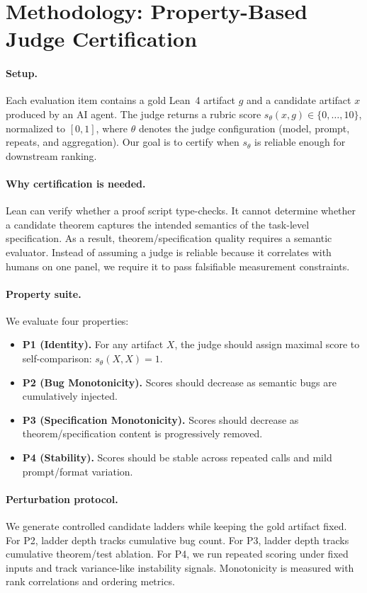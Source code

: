 \section{Methodology: Property-Based Judge Certification}

\paragraph{Setup.}
Each evaluation item contains a gold Lean~4 artifact \(g\) and a candidate artifact \(x\) produced by an AI agent.
The judge returns a rubric score \(s_\theta(x,g)\in\{0,\dots,10\}\), normalized to \([0,1]\), where \(\theta\) denotes the judge configuration (model, prompt, repeats, and aggregation).
Our goal is to certify when \(s_\theta\) is reliable enough for downstream ranking.

\paragraph{Why certification is needed.}
Lean can verify whether a proof script type-checks.
It cannot determine whether a candidate theorem captures the intended semantics of the task-level specification.
As a result, theorem/specification quality requires a semantic evaluator.
Instead of assuming a judge is reliable because it correlates with humans on one panel, we require it to pass falsifiable measurement constraints.

\paragraph{Property suite.}
We evaluate four properties:
\begin{itemize}
\item \textbf{P1 (Identity).} For any artifact \(X\), the judge should assign maximal score to self-comparison: \(s_\theta(X,X)=1\).
\item \textbf{P2 (Bug Monotonicity).} Scores should decrease as semantic bugs are cumulatively injected.
\item \textbf{P3 (Specification Monotonicity).} Scores should decrease as theorem/specification content is progressively removed.
\item \textbf{P4 (Stability).} Scores should be stable across repeated calls and mild prompt/format variation.
\end{itemize}

\paragraph{Perturbation protocol.}
We generate controlled candidate ladders while keeping the gold artifact fixed.
For P2, ladder depth tracks cumulative bug count.
For P3, ladder depth tracks cumulative theorem/test ablation.
For P4, we run repeated scoring under fixed inputs and track variance-like instability signals.
Monotonicity is measured with rank correlations and ordering metrics.


